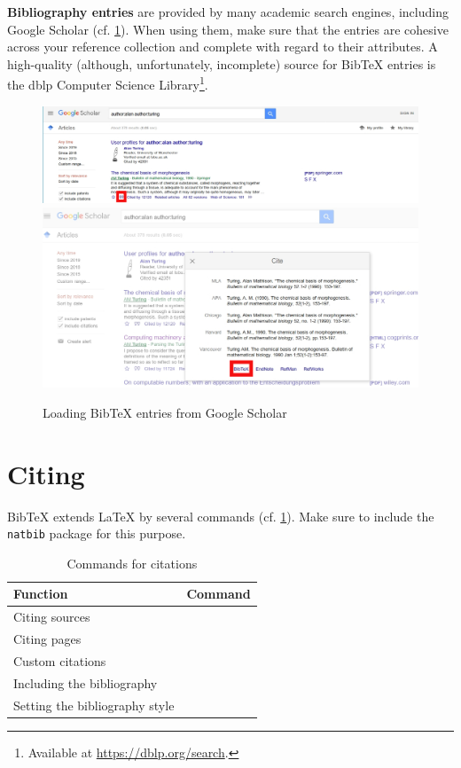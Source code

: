 \textbf{Bibliography entries} are provided by many academic search engines, including Google Scholar (cf. \cref{fig:google-scholar-bibtex}).
When using them, make sure that the entries are cohesive across your reference collection and complete with regard to their attributes.
A high-quality (although, unfortunately, incomplete) source for Bib\TeX{} entries is the dblp Computer Science Library\footnote{Available at \url{https://dblp.org/search}.}.

\begin{figure}[H]
  \includegraphics[width=\textwidth]{graphics/google_bibtex1.jpg}  
  \includegraphics[width=\textwidth]{graphics/google_bibtex2.jpg}  
  \caption{Loading Bib\TeX{} entries from Google Scholar}
  \label{fig:google-scholar-bibtex}
\end{figure}

\section{Citing}
Bib\TeX{} extends \LaTeX{} by several commands (cf. \cref{tbl:bibtex-commands}). 
Make sure to include the \texttt{natbib} package for this purpose.

\begin{table}[H]
  \centering
  \begin{tabular}{ll}
  \toprule
  Function                 & Command \\ \midrule
  Citing sources           & \texttt{\cite{<source>}} \\
  Citing pages             & \texttt{\cite[p. 15]{<source>}} \\
  Custom citations         & \texttt{\cite[<prefix>][<suffix>]{<source>}} \\
  Including the bibliography     & \texttt{} \\
  Setting the bibliography style & \texttt{} \\ \bottomrule
  \end{tabular}
  \caption{Commands for citations}
  \label{tbl:bibtex-commands}
\end{table}

